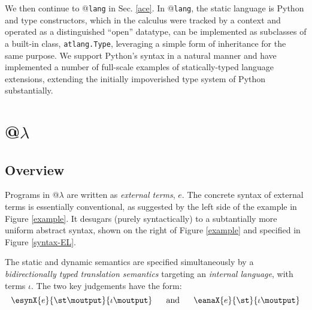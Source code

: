 We then continue to @\texttt{lang} in Sec. \ref{ace}. In @\texttt{lang}, the static language is Python and type constructors, which in the calculus were  tracked by a context and operated as a distinguished ``open'' datatype, can be implemented as subclasses of a built-in class, \verb|atlang.Type|, leveraging a simple form of inheritance for the same purpose. We support Python's syntax in a natural manner and have implemented a number of full-scale examples of statically-typed language extensions, extending the initially impoverished type system of Python substantially.%

\section{@$\lambda$}\label{theory}
\subsection{Overview}
Programs in @$\lambda$ are written as \emph{external terms}, $e$. The concrete syntax of external terms is essentially conventional, as suggested by the left side of the example in Figure \ref{example}. It desugars (purely syntactically) to a subtantially more uniform abstract syntax, shown on the right of Figure \ref{example} and specified in Figure \ref{syntax-EL}.%

The static and dynamic semantics are specified simultaneously by a \emph{bidirectionally typed translation semantics} targeting an \emph{internal language}, with terms $\iota$. The two key judgements have the form:  \[\esynX{e}{\st\moutput}{\iota\moutput} ~~~~~\text{and}~~~~~ \eanaX{e}{\st}{\iota\moutput}\]
\noindent

